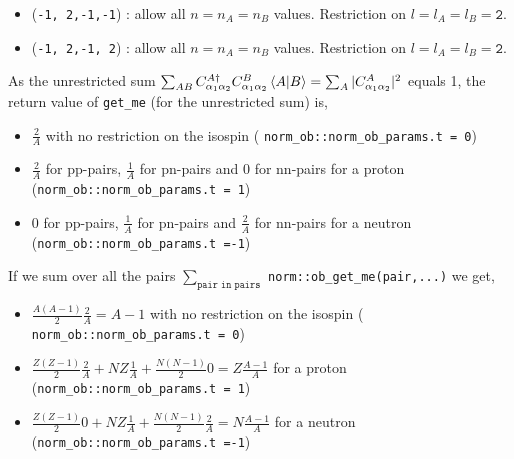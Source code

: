 \documentclass[10pt]{article}
\begin{document}
\begin{itemize}
		\begin{itemize}
			\item (\texttt{-1, 2,-1,-1}) : allow all $n = n_A = n_B$ values. Restriction on $l = l_A = l_B = \texttt{2}$.
			\item (\texttt{-1, 2,-1, 2}) : allow all $n = n_A = n_B$ values. Restriction on $l = l_A = l_B = \texttt{2}$.
		\end{itemize}
	As the unrestricted sum $\sum_{ A B } C_{\alpha_1 \alpha_2}^{A \dagger} C_{\alpha_1 \alpha_2}^{B} \braket {A | B } = \sum_{A} | C^{A}_{\alpha_1 \alpha_2}|^{2} $ equals 1, the return value of \texttt{get\_me} (for the unrestricted sum) is,
	\begin{itemize}
		\item $\frac{2}{A}$ with no restriction on the isospin ( \texttt{norm\_ob::norm\_ob\_params.t = 0})
		\item $\frac{2}{A}$ for pp-pairs, $\frac{1}{A}$ for pn-pairs and $0$ for nn-pairs for a proton (\texttt{norm\_ob::norm\_ob\_params.t~=~1})
		\item $0$ for pp-pairs, $\frac{1}{A}$ for pn-pairs and $\frac{2}{A}$ for nn-pairs for a neutron (\texttt{norm\_ob::norm\_ob\_params.t~=-1})
	\end{itemize}
	If we sum over all the pairs $ \sum_{\texttt{pair in pairs}} $ \texttt{norm::ob\_get\_me(pair,...)} we get,
	\begin{itemize}
		\item $\frac{A(A-1)}{2} \frac{2}{A} = A-1$ with no restriction on the isospin ( \texttt{norm\_ob::norm\_ob\_params.t~=~0})
		\item $\frac{Z(Z-1)}{2}\frac{2}{A} + NZ \frac{1}{A} + \frac{N(N-1)}{2} 0 = Z \frac{A-1}{A}$ for a proton (\texttt{norm\_ob::norm\_ob\_params.t~=~1})
		\item $\frac{Z(Z-1)}{2}0 + NZ \frac{1}{A} + \frac{N(N-1)}{2} \frac{2}{A} = N \frac{A-1}{A}$ for a neutron (\texttt{norm\_ob::norm\_ob\_params.t~=-1})
	\end{itemize}
\end{itemize}
\end{document}
